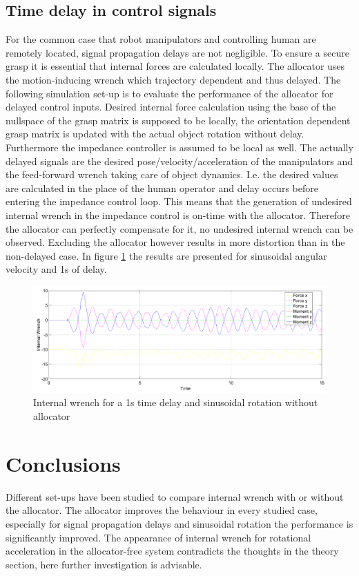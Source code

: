 \documentclass[conference]{IEEEtran}
\begin{document}
\subsection{Time delay in control signals}
For the common case that robot manipulators and controlling human are remotely located, signal propagation delays are not negligible. To ensure a secure grasp it is essential that internal forces are calculated locally. The allocator uses the motion-inducing wrench which trajectory dependent and thus delayed. The following simulation set-up is to evaluate the performance of the allocator for delayed control inputs. Desired internal force calculation using the base of the nullspace of the grasp matrix is supposed to be locally, the orientation dependent grasp matrix is updated with the actual object rotation without delay. Furthermore the impedance controller is assumed to be local as well. The actually delayed signals are the desired pose/velocity/acceleration of the manipulators and the feed-forward wrench taking care of object dynamics. I.e. the desired values are calculated in the place of the human operator and delay occurs before entering the impedance control loop. This means that the generation of undesired internal wrench in the impedance control is on-time with the allocator. Therefore the allocator can perfectly compensate for it, no undesired internal wrench can be observed. Excluding the allocator however results in more distortion than in the non-delayed case. In figure \ref{IntDelay} the results are presented for sinusoidal angular velocity and 1s of delay.       
\begin{figure}
\includegraphics[width=\linewidth]{IntDelay}
\caption{Internal wrench for a 1s time delay and sinusoidal rotation without allocator}
\label{IntDelay}
\end{figure}

\section{Conclusions}
Different set-ups have been studied to compare internal wrench with or without the allocator. The allocator improves the behaviour in every studied case, especially for signal propagation delays and sinusoidal rotation the performance is significantly improved. The appearance of internal wrench for rotational acceleration in the allocator-free system contradicts the thoughts in the theory section, here further investigation is advisable. 







\end{document}
